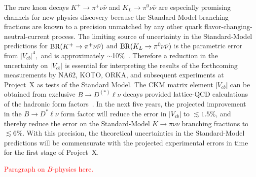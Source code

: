 \begin{itemize}
The rare kaon decays $K^+ \to \pi^+ \nu \bar{\nu}$ and $K_L \to \pi^0 \nu \bar{\nu}$ are especially promising channels for new-physics discovery because the Standard-Model branching fractions are known to a precision unmatched by any other quark flavor-changing-neutral-current process.  The limiting source of uncertainty in the Standard-Model predictions for $\mbox{\rm BR}(K^+ \to \pi^+ \nu \bar{\nu})$ and $\mbox{\rm BR}(K_L \to \pi^0 \nu \bar{\nu})$ is the parametric error from $|V_{cb}|^4,$ and is approximately $\sim$10\%~\cite{Brod:2010hi}.  Therefore a reduction in the uncertainty on $|V_{cb}|$ is essential for interpreting the results of the forthcoming measurements by NA62, KOTO, ORKA, and subsequent experiments at Project~X as tests of the Standard Model.  The CKM matrix element $|V_{cb}|$ can be obtained from exclusive $B \to D^{(*)} \ell\nu$ decays provided
lattice-QCD calculations of the hadronic form factors~\cite{Bailey:2010gb}.  In the next five years, the projected improvement in the $B\to D^* \ell\nu$ form factor will reduce the error in $|V_{cb}|$ to
$\lesssim 1.5\%$, and thereby reduce the error on the Standard-Model $K\to\pi\nu\bar{\nu}$ branching
fractions to $\lesssim 6$\%.  With this precision, the theoretical uncertainties in the Standard-Model predictions will be commensurate
with the projected experimental errors in time for the first stage of Project~X.

\textcolor{red}{Paragraph on $B$-physics here.}


\end{itemize}
